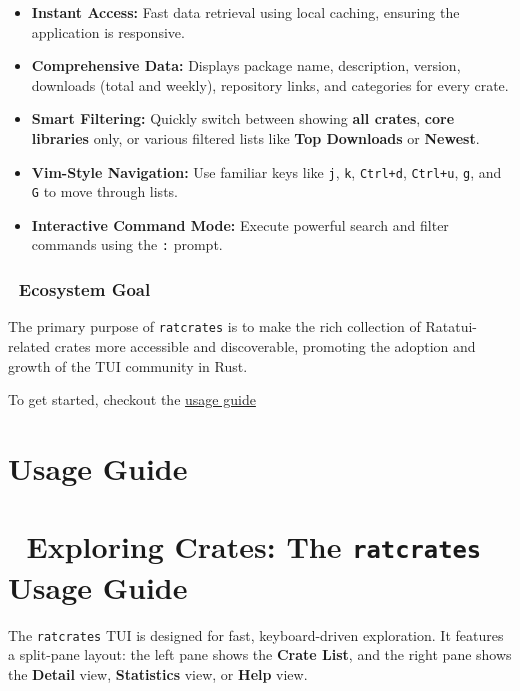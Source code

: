 \documentclass[
  letterpaper,
  DIV=11,
  numbers=noendperiod]{scrreprt}
\providecommand{\tightlist}{%
  \setlength{\itemsep}{0pt}\setlength{\parskip}{0pt}}
\begin{document}
\begin{itemize}
\tightlist
\item
  \textbf{Instant Access:} Fast data retrieval using local caching,
  ensuring the application is responsive.
\item
  \textbf{Comprehensive Data:} Displays package name, description,
  version, downloads (total and weekly), repository links, and
  categories for every crate.
\item
  \textbf{Smart Filtering:} Quickly switch between showing \textbf{all
  crates}, \textbf{core libraries} only, or various filtered lists like
  \textbf{Top Downloads} or \textbf{Newest}.
\item
  \textbf{Vim-Style Navigation:} Use familiar keys like \texttt{j},
  \texttt{k}, \texttt{Ctrl+d}, \texttt{Ctrl+u}, \texttt{g}, and
  \texttt{G} to move through lists.
\item
  \textbf{Interactive Command Mode:} Execute powerful search and filter
  commands using the \texttt{:} prompt.
\end{itemize}

\subsection{🎯 Ecosystem Goal}\label{ecosystem-goal}

The primary purpose of \texttt{ratcrates} is to make the rich collection
of Ratatui-related crates more accessible and discoverable, promoting
the adoption and growth of the TUI community in Rust.

To get started, checkout the \href{usage.qmd}{usage guide}

\chapter{Usage Guide}\label{usage-guide}

\chapter{\texorpdfstring{🚀 Exploring Crates: The \texttt{ratcrates}
Usage
Guide}{🚀 Exploring Crates: The ratcrates Usage Guide}}\label{exploring-crates-the-ratcrates-usage-guide}

The \texttt{ratcrates} TUI is designed for fast, keyboard-driven
exploration. It features a split-pane layout: the left pane shows the
\textbf{Crate List}, and the right pane shows the \textbf{Detail} view,
\textbf{Statistics} view, or \textbf{Help} view.
\end{document}
